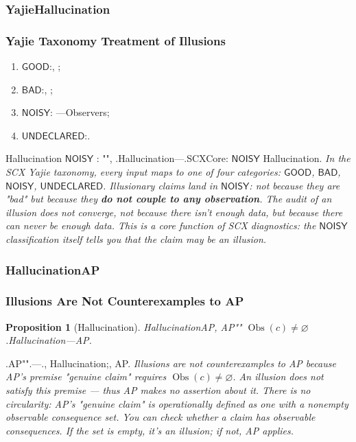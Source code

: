 \documentclass[12pt,a4paper]{article}
\theoremstyle{plain}
\newtheorem{proposition}[theorem]{Proposition}
\theoremstyle{definition}
\theoremstyle{remark}
\newcommand{\Null}{\varnothing}
\DeclareMathOperator{\ObsSet}{Obs}
\begin{document}
\subsubsection{YajieHallucination}
\subsubsection{Yajie Taxonomy Treatment of Illusions}
\begin{enumerate}[label=(\alph*)]
 \item $\mathsf{GOOD}$:, ; 
 \item $\mathsf{BAD}$:, ; 
 \item $\mathsf{NOISY}$: ---Observers; 
 \item $\mathsf{UNDECLARED}$:.
\end{enumerate}
Hallucination $\mathsf{NOISY}$ : "", .Hallucination---.SCXCore: $\mathsf{NOISY}$ Hallucination.
\vspace{4pt}
\noindent
\textit{In the SCX Yajie taxonomy, every input maps to one of four categories: $\mathsf{GOOD}$, $\mathsf{BAD}$, $\mathsf{NOISY}$, $\mathsf{UNDECLARED}$. Illusionary claims land in $\mathsf{NOISY}$: not because they are "bad" but because they \textbf{do not couple to any observation}. The audit of an illusion does not converge, not because there isn't enough data, but because there can never be enough data. This is a core function of SCX diagnostics: the $\mathsf{NOISY}$ classification itself tells you that the claim may be an illusion.}
\subsubsection{HallucinationAP}
\subsubsection{Illusions Are Not Counterexamples to AP}
\begin{proposition}[Hallucination]\label{prop:illusion_not_counter}
HallucinationAP, AP"" $\ObsSet(c) \neq \Null$.Hallucination---AP.
\end{proposition}
.AP""\textit{}.---., Hallucination;, AP.
\vspace{4pt}
\noindent
\textit{Illusions are not counterexamples to AP because AP's premise "genuine claim" requires $\ObsSet(c) \neq \Null$. An illusion does not satisfy this premise --- thus AP makes no assertion about it. There is no circularity: AP's "genuine claim" is operationally defined as one with a nonempty observable consequence set. You can check whether a claim has observable consequences. If the set is empty, it's an illusion; if not, AP applies.}
\end{document}
